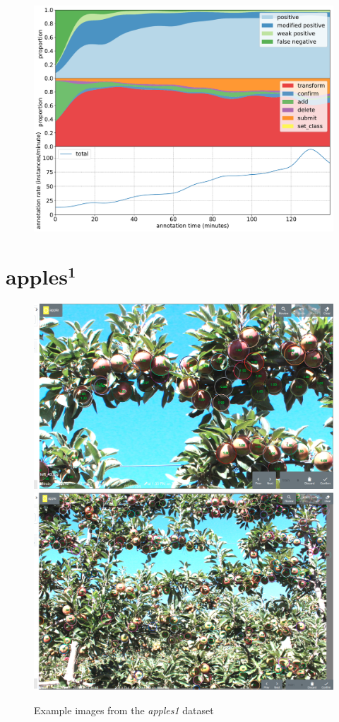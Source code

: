 \begin{figure}[!h]
\centering
\includegraphics[width=1.0\linewidth]{charts/action_annotations/penguins.pdf}
\caption{  }
\label{fig:penguin_annotation}
\end{figure}



\pagebreak
\section{$\mathbf{apples^1}$}

\begin{figure}[!h]
  \includegraphics[width=0.475\linewidth]{figures/annotation/screenshots/apples_big.png}
  \hfill
  \includegraphics[width=0.45\linewidth]{figures/annotation/screenshots/apples_small.png}
\caption{Example images from the \emph{apples1} dataset}
\label{fig:apples1_dataset}  
\end{figure}

